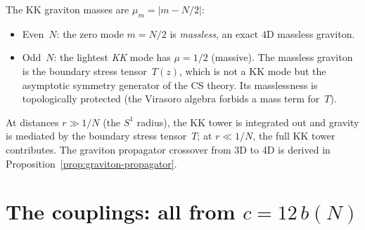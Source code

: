 \begin{remark}
\label{rmk:mass-spectrum}
The KK graviton masses are $\mu_m = |m - N/2|$:
\begin{itemize}
\item Even~$N$: the zero mode $m = N/2$ is
  \emph{massless}, an exact $4$D massless graviton.
\item Odd~$N$: the lightest \emph{KK} mode has $\mu = 1/2$ (massive).
  The massless graviton is the boundary stress tensor~$T(z)$,
  which is not a KK mode but the asymptotic symmetry
  generator of the CS theory.
  Its masslessness is topologically protected
  (the Virasoro algebra forbids a mass term for~$T$).
\end{itemize}
At distances $r \gg 1/N$ (the $S^1$ radius),
the KK tower is integrated out and gravity is mediated by the
boundary stress tensor~$T$; at $r \ll 1/N$, the full KK tower
contributes.
The graviton propagator crossover from 3D to 4D
is derived in Proposition~\ref{prop:graviton-propagator}.
\end{remark}

\section{The couplings: all from $c = 12\,b(N)$}
\label{sec:couplings}


